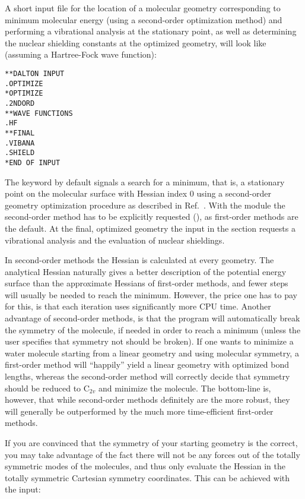 A short input file for the location of a molecular geometry
corresponding to minimum molecular energy
(using a second-order optimization
method) and performing a vibrational
analysis at the stationary point, as well
as determining the nuclear
shielding constants at the optimized
geometry, will look like
(assuming a Hartree-Fock wave function):

\begin{verbatim}
**DALTON INPUT
.OPTIMIZE
*OPTIMIZE
.2NDORD
**WAVE FUNCTIONS
.HF
**FINAL
.VIBANA
.SHIELD
*END OF INPUT
\end{verbatim}

The keyword  by default signals a search for a minimum,
that is, a stationary point on the molecular surface with Hessian
index 0 using a second-order geometry optimization procedure as
described in Ref.~\cite{tuhjahjajpjjcp84}. With the 
module the second-order method has to be explicitly requested
(), as first-order methods are the default. At the final,
optimized geometry the input in the  section requests a
vibrational analysis and the evaluation of nuclear shieldings.

In second-order methods the Hessian is calculated at every
geometry. The analytical Hessian naturally gives a better description
of the potential energy surface than the approximate Hessians of
first-order methods, and fewer steps will usually be needed to reach
the minimum. However, the price one has to pay for this, is that each
iteration uses significantly more CPU time. Another advantage of
second-order methods, is that the program will automatically break the
symmetry of the molecule, if needed in order
to reach a minimum
(unless the user specifies that symmetry not should be broken). If
one wants to minimize a water molecule starting from a linear
geometry and using molecular symmetry, a first-order method will
``happily'' yield a linear geometry with optimized bond lengths, whereas
the second-order method will correctly decide that symmetry should be
reduced to C$_{2v}$ and minimize the molecule.
The bottom-line is, however, that while second-order methods
definitely are the more robust, they will generally be outperformed by
the much more time-efficient first-order methods.

If you are convinced that the symmetry of your starting geometry
is the correct, you may take advantage of the fact there will not
be any forces out of the totally symmetric modes of the molecules,
and thus only evaluate the Hessian in the totally symmetric
Cartesian symmetry coordinates. This can be achieved with the
input:

